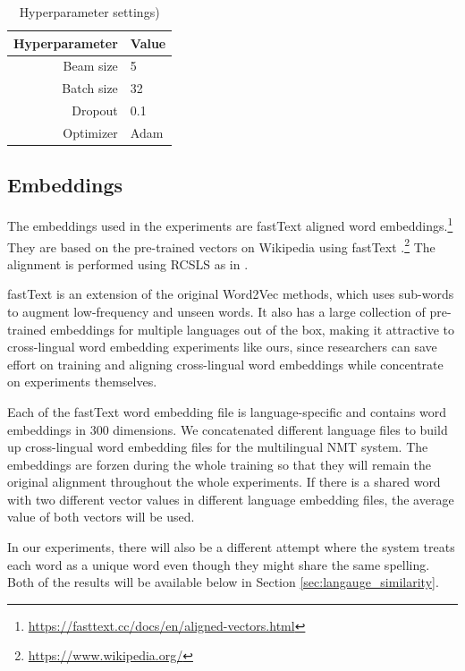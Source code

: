 \documentclass[thesis,fonts=libertine]{cluu}
\begin{document}
\begin{table}
  \centering
  \begin{tabular}{|r|l|}
    \hline
    Hyperparameter & Value \\ [0.25ex]
    \hline\hline
    Beam size & 5 \\
    \hline
    Batch size & 32 \\ 
    \hline
    Dropout & 0.1 \\
    \hline
    Optimizer & Adam \parencite{Kingma:2014aa} \\
    \hline
  \end{tabular}
  \caption{Hyperparameter settings)}
  \label{table:hyperparameters}
\end{table}

\subsection{Embeddings}

The embeddings used in the experiments are fastText aligned word embeddings.\footnote{\url{https://fasttext.cc/docs/en/aligned-vectors.html}} They are based on the pre-trained vectors on Wikipedia using fastText \parencite{Bojanowski:2016aa}.\footnote{\url{https://www.wikipedia.org/}} The alignment is performed using RCSLS as in \textcite{Joulin:2018aa}.

fastText is an extension of the original Word2Vec methods, which uses sub-words to augment low-frequency and unseen words. It also has a large collection of pre-trained embeddings for multiple languages out of the box, making it attractive to cross-lingual word embedding experiments like ours, since researchers can save effort on training and aligning cross-lingual word embeddings while concentrate on experiments themselves.

Each of the fastText word embedding file is language-specific and contains word embeddings in 300 dimensions. We concatenated different language files to build up cross-lingual word embedding files for the multilingual NMT system. The embeddings are forzen during the whole training so that they will remain the original alignment throughout the whole experiments. If there is a shared word with two different vector values in different language embedding files, the average value of both vectors will be used.

In our experiments, there will also be a different attempt where the system treats each word as a unique word even though they might share the same spelling. Both of the results will be available below in Section \ref{sec:langauge_similarity}.
\end{document}

